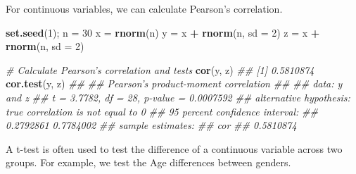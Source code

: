 \documentclass[
]{article}
\newenvironment{Shaded}{\begin{snugshade}}{\end{snugshade}}
\newcommand{\CommentTok}[1]{\textcolor[rgb]{0.56,0.35,0.01}{\textit{#1}}}
\newcommand{\DataTypeTok}[1]{\textcolor[rgb]{0.13,0.29,0.53}{#1}}
\newcommand{\DecValTok}[1]{\textcolor[rgb]{0.00,0.00,0.81}{#1}}
\newcommand{\KeywordTok}[1]{\textcolor[rgb]{0.13,0.29,0.53}{\textbf{#1}}}
\newcommand{\NormalTok}[1]{#1}
\newcommand{\OperatorTok}[1]{\textcolor[rgb]{0.81,0.36,0.00}{\textbf{#1}}}
\newcommand{\StringTok}[1]{\textcolor[rgb]{0.31,0.60,0.02}{#1}}
\begin{document}
For continuous variables, we can calculate Pearson's correlation.

\begin{Shaded}
\begin{Highlighting}[]
    \KeywordTok{set.seed}\NormalTok{(}\DecValTok{1}\NormalTok{); n =}\StringTok{ }\DecValTok{30}
\NormalTok{    x =}\StringTok{ }\KeywordTok{rnorm}\NormalTok{(n)}
\NormalTok{    y =}\StringTok{ }\NormalTok{x }\OperatorTok{+}\StringTok{ }\KeywordTok{rnorm}\NormalTok{(n, }\DataTypeTok{sd =} \DecValTok{2}\NormalTok{)}
\NormalTok{    z =}\StringTok{ }\NormalTok{x }\OperatorTok{+}\StringTok{ }\KeywordTok{rnorm}\NormalTok{(n, }\DataTypeTok{sd =} \DecValTok{2}\NormalTok{)}
    
    \CommentTok{# Calculate Pearson's correlation and tests}
    \KeywordTok{cor}\NormalTok{(y, z)}
\CommentTok{## [1] 0.5810874}
    \KeywordTok{cor.test}\NormalTok{(y, z)}
\CommentTok{## }
\CommentTok{##  Pearson's product-moment correlation}
\CommentTok{## }
\CommentTok{## data:  y and z}
\CommentTok{## t = 3.7782, df = 28, p-value = 0.0007592}
\CommentTok{## alternative hypothesis: true correlation is not equal to 0}
\CommentTok{## 95 percent confidence interval:}
\CommentTok{##  0.2792861 0.7784002}
\CommentTok{## sample estimates:}
\CommentTok{##       cor }
\CommentTok{## 0.5810874}
\end{Highlighting}
\end{Shaded}

A t-test is often used to test the difference of a continuous variable
across two groups. For example, we test the Age differences between
genders.

\begin{Shaded}
\end{Shaded}
\end{document}
